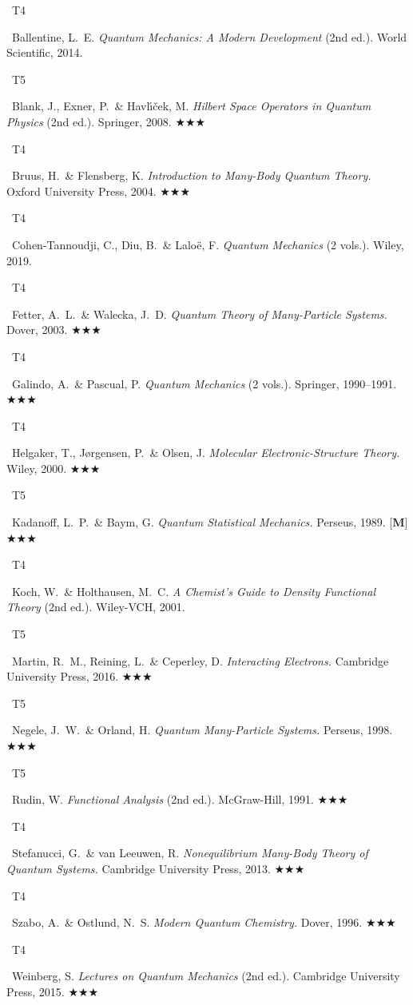 \documentclass[11pt,a4paper]{article}
\newcommand{\tierbadge}[2]{%
  \colorbox{#1}{\small\bfseries\color{white}\strut\ #2\ }%
}
\newcommand{\essential}{$\bigstar\bigstar\bigstar$}
\begin{document}
\begin{tcolorbox}[catbox]
\begin{enumerate}[leftmargin=2.5em, label=\textbf{[C\arabic*]}, itemsep=5pt]
  \item \tierbadge{t4orange}{T4}\ Ballentine, L.~E. \textit{Quantum Mechanics: A Modern Development} (2nd ed.). World Scientific, 2014.
  \item \tierbadge{t5red}{T5}\ Blank, J., Exner, P.\ \& Havl\'{\i}\v{c}ek, M. \textit{Hilbert Space Operators in Quantum Physics} (2nd ed.). Springer, 2008. \essential
  \item \tierbadge{t4orange}{T4}\ Bruus, H.\ \& Flensberg, K. \textit{Introduction to Many-Body Quantum Theory.} Oxford University Press, 2004. \essential
  \item \tierbadge{t4orange}{T4}\ Cohen-Tannoudji, C., Diu, B.\ \& Lalo\"e, F. \textit{Quantum Mechanics} (2 vols.). Wiley, 2019.
  \item \tierbadge{t4orange}{T4}\ Fetter, A.~L.\ \& Walecka, J.~D. \textit{Quantum Theory of Many-Particle Systems.} Dover, 2003. \essential
  \item \tierbadge{t4orange}{T4}\ Galindo, A.\ \& Pascual, P. \textit{Quantum Mechanics} (2 vols.). Springer, 1990--1991. \essential
  \item \tierbadge{t4orange}{T4}\ Helgaker, T., J\o rgensen, P.\ \& Olsen, J. \textit{Molecular Electronic-Structure Theory.} Wiley, 2000. \essential
  \item \tierbadge{t5red}{T5}\ Kadanoff, L.~P.\ \& Baym, G. \textit{Quantum Statistical Mechanics.} Perseus, 1989. [\textbf{M}] \essential
  \item \tierbadge{t4orange}{T4}\ Koch, W.\ \& Holthausen, M.~C. \textit{A Chemist's Guide to Density Functional Theory} (2nd ed.). Wiley-VCH, 2001.
  \item \tierbadge{t5red}{T5}\ Martin, R.~M., Reining, L.\ \& Ceperley, D. \textit{Interacting Electrons.} Cambridge University Press, 2016. \essential
  \item \tierbadge{t5red}{T5}\ Negele, J.~W.\ \& Orland, H. \textit{Quantum Many-Particle Systems.} Perseus, 1998. \essential
  \item \tierbadge{t5red}{T5}\ Rudin, W. \textit{Functional Analysis} (2nd ed.). McGraw-Hill, 1991. \essential
  \item \tierbadge{t4orange}{T4}\ Stefanucci, G.\ \& van Leeuwen, R. \textit{Nonequilibrium Many-Body Theory of Quantum Systems.} Cambridge University Press, 2013. \essential
  \item \tierbadge{t4orange}{T4}\ Szabo, A.\ \& Ostlund, N.~S. \textit{Modern Quantum Chemistry.} Dover, 1996. \essential
  \item \tierbadge{t4orange}{T4}\ Weinberg, S. \textit{Lectures on Quantum Mechanics} (2nd ed.). Cambridge University Press, 2015. \essential
\end{enumerate}
\end{tcolorbox}
\end{document}
